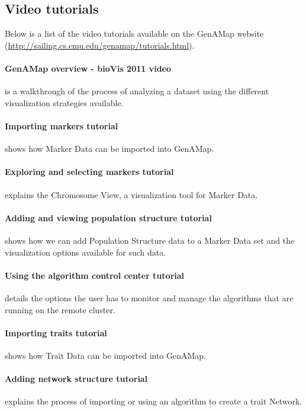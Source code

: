 \documentclass{article}
\begin{document}
\begin{appendices}

\section{Video tutorials} \label{videos}

Below is a list of the video tutorials available on the GenAMap website (\url{http://sailing.cs.cmu.edu/genamap/tutorials.html}). %

\paragraph{GenAMap overview - bioVis 2011 video} is a walkthrough of the process of analyzing a dataset using the different visualization strategies available.
\paragraph{Importing markers tutorial}  shows how Marker Data can be imported into GenAMap.
\paragraph{Exploring and selecting markers tutorial} explains the Chromosome View, a visualization tool for Marker Data.
\paragraph{Adding and viewing population structure tutorial} shows how we can add Population Structure data to a Marker Data set and the visualization options available for such data.
\paragraph{Using the algorithm control center tutorial} details the options the user has to monitor and manage the algorithms that are running on the remote cluster.
\paragraph{Importing traits tutorial} shows how Trait Data can be imported into GenAMap.
\paragraph{Adding network structure tutorial} explains the process of importing or using an algorithm to create a trait Network.

\end{appendices}
\end{document}
